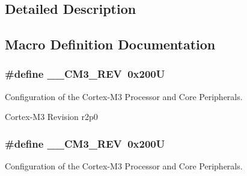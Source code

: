 \subsection{Detailed Description}


\subsection{Macro Definition Documentation}
\hypertarget{group___configuration__section__for___c_m_s_i_s_gac6a3f185c4640e06443c18b3c8d93f53}{
\subsubsection[{\-\_\-\-\_\-\-C\-M3\-\_\-\-R\-E\-V}]{\setlength{\rightskip}{0pt plus 5cm}\#define \-\_\-\-\_\-\-C\-M3\-\_\-\-R\-E\-V~0x200\-U}}\label{group___configuration__section__for___c_m_s_i_s_gac6a3f185c4640e06443c18b3c8d93f53}


Configuration of the Cortex-\/\-M3 Processor and Core Peripherals. 

Cortex-\/\-M3 Revision r2p0 \hypertarget{group___configuration__section__for___c_m_s_i_s_gac6a3f185c4640e06443c18b3c8d93f53}{
\subsubsection[{\-\_\-\-\_\-\-C\-M3\-\_\-\-R\-E\-V}]{\setlength{\rightskip}{0pt plus 5cm}\#define \-\_\-\-\_\-\-C\-M3\-\_\-\-R\-E\-V~0x200\-U}}\label{group___configuration__section__for___c_m_s_i_s_gac6a3f185c4640e06443c18b3c8d93f53}


Configuration of the Cortex-\/\-M3 Processor and Core Peripherals. 

